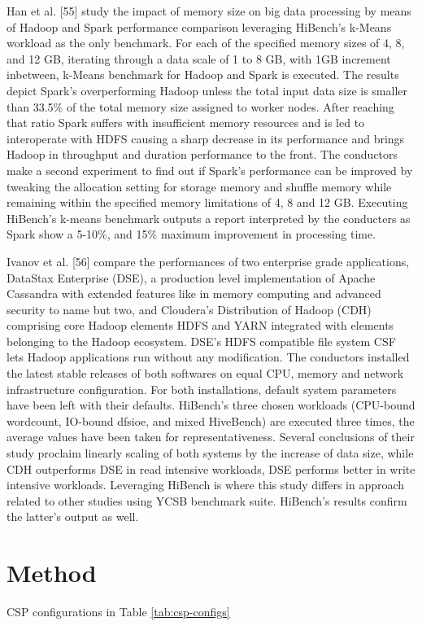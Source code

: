 \documentclass[review]{elsarticle}
\begin{document}
Han et al. [55] study the impact of memory size on big data processing by means of Hadoop and Spark performance comparison leveraging HiBench’s k-Means workload as the only benchmark. For each of the specified memory sizes of 4, 8, and 12 GB, iterating through a data scale of 1 to 8 GB, with 1GB increment inbetween, k-Means benchmark for Hadoop and Spark is executed. The results depict Spark’s overperforming Hadoop unless the total input data size is smaller than 33.5\% of the total memory size assigned to worker nodes. After reaching that ratio Spark suffers with insufficient memory resources and is led to interoperate with HDFS causing a sharp decrease in its performance and brings Hadoop in throughput and duration performance to the front. The conductors make a second experiment to find out if Spark’s performance can be improved by tweaking the allocation setting for storage memory and shuffle memory while remaining within the specified memory limitations of 4, 8 and 12 GB. Executing HiBench’s k-means benchmark outputs a report interpreted by the conducters as Spark show a 5-10\%, and 15\% maximum improvement in processing time.

Ivanov et al. [56] compare the performances of two enterprise grade applications, DataStax Enterprise (DSE), a production level implementation of Apache Cassandra with extended features like in memory computing and advanced security to name but two, and Cloudera’s Distribution of Hadoop (CDH) comprising core Hadoop elements HDFS and YARN integrated with elements belonging to the Hadoop ecosystem. DSE’s HDFS compatible file system CSF lets Hadoop applications run without any modification. The conductors installed the latest stable releases of both softwares on equal CPU, memory and network infrastructure configuration. For both installations, default system parameters have been left with their defaults. HiBench’s three chosen workloads (CPU-bound wordcount, IO-bound dfsioe, and mixed HiveBench) are executed three times, the average values have been taken for representativeness. Several conclusions of their study proclaim linearly scaling of both systems by the increase of data size, while CDH outperforms DSE in read intensive workloads, DSE performs better in write intensive workloads. Leveraging HiBench is where this study differs in approach related to other studies using YCSB benchmark suite. HiBench’s results confirm the latter’s output as well.




\section{Method}
CSP configurations in Table \ref{tab:csp-configs}
\end{document}
